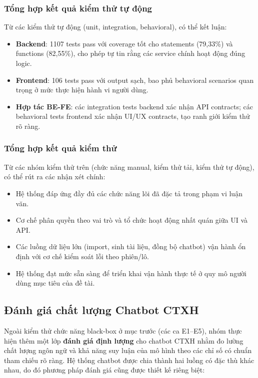 \subsubsection{Tổng hợp kết quả kiểm thử tự động}
Từ các kiểm thử tự động (unit, integration, behavioral), có thể kết luận:
\begin{itemize}
	\item \textbf{Backend}: 1107 tests pass với coverage tốt cho statements (79,33\%) và functions (82,55\%), cho phép tự tin rằng các service chính hoạt động đúng logic.
	\item \textbf{Frontend}: 106 tests pass với output sạch, bao phủ behavioral scenarios quan trọng ở mức thực hiện hành vi người dùng.
	\item \textbf{Hợp tác BE-FE}: các integration tests backend xác nhận API contracts; các behavioral tests frontend xác nhận UI/UX contracts, tạo ranh giới kiểm thử rõ ràng.
\end{itemize}

\subsubsection{Tổng hợp kết quả kiểm thử}
Từ các nhóm kiểm thử trên (chức năng manual, kiểm thử tải, kiểm thử tự động), có thể rút ra các nhận xét chính:
\begin{itemize}
	\item Hệ thống đáp ứng đầy đủ các chức năng lõi đã đặc tả trong phạm vi luận văn.
	\item Cơ chế phân quyền theo vai trò và tổ chức hoạt động nhất quán giữa UI và API.
	\item Các luồng dữ liệu lớn (import, sinh tài liệu, đồng bộ chatbot) vận hành ổn định với cơ chế kiểm soát lỗi theo phiên/lô.
	\item Hệ thống đạt mức sẵn sàng để triển khai vận hành thực tế ở quy mô người dùng mục tiêu của đề tài.
\end{itemize}


\subsection{Đánh giá chất lượng Chatbot CTXH}

Ngoài kiểm thử chức năng black-box ở mục trước (các ca E1–E5), nhóm thực hiện thêm một lớp \textbf{đánh giá định lượng} cho chatbot CTXH nhằm đo lường chất lượng ngôn ngữ và khả năng suy luận của mô hình theo các chỉ số có chuẩn tham chiếu rõ ràng.
Hệ thống chatbot được chia thành hai luồng có đặc thù khác nhau, do đó phương pháp đánh giá cũng được thiết kế riêng biệt:


